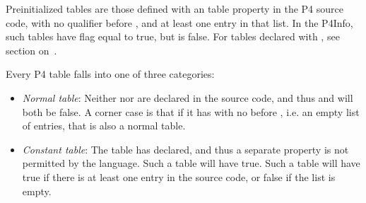 \documentclass[11pt]{article}
\begin{document}
{%
\noindent{}Preinitialized tables are those defined with an  table
property in the P4 source code, with no  qualifier before
, and at least one entry in that list.  In the P4Info, such
tables have  flag equal to true, but
 is false.  For tables declared with ,
see section on~.%

Every P4 table falls into one of three categories:%

\begin{itemize}[noitemsep,topsep=\mdcompacttopsep]%

\item{}\emph{Normal table}: Neither  nor  are declared
in the source code, and thus  and
 will both be false.  A corner case is that if
it has  with no  before , i.e. an
empty list of entries, that is also a normal table.%

\item{}\emph{Constant table}: The table has  declared, and thus a
separate  property is not permitted by the language.  Such
a table will have  true.  Such a table will have
 true if there is at least one entry in the
source code, or false if the list is empty.%


\end{itemize}}
\end{document}
